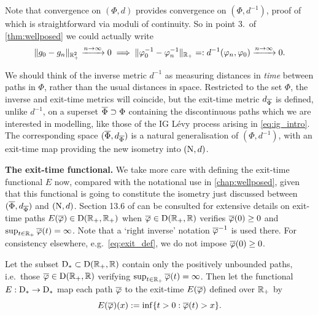Note that convergence on $(\Phi,d)$ provides convergence on $(\Phi,d^{-1})$, proof of which is straightforward via moduli of continuity. So in point 3.~of \autoref{thm:wellposed} we could actually write
\begin{equation}\label{eq:inverse_cont}
    \Vert g_0-g_n\Vert_{\mathbb{R}_+^2}\xrightarrow{n\to\infty}0 \implies \Vert \varphi_0^{-1}-\varphi_n^{-1}\Vert_{\mathbb{R}_+}=:d^{-1}(\varphi_n,\varphi_0)\xrightarrow{n\to\infty}0.
\end{equation}

We should think of the inverse metric $d^{-1}$ as measuring distances in \emph{time} between paths in $\Phi$, rather than the usual distances in space. Restricted to the set $\Phi$, the inverse and exit-time metrics will coincide, but the exit-time metric $d_{\overline{\Phi}}$ is defined, unlike $d^{-1}$, on a superset $\overline{\Phi}\supset\Phi$ containing the discontinuous paths which we are interested in modelling, like those of the IG L\'evy process arising in \autoref{eq:ig_intro}. The corresponding space $(\overline{\Phi},d_{\overline{\Phi}})$ is a natural generalisation of $(\Phi,d^{-1})$, with an exit-time map providing the new isometry into $(\mathrm{N},d)$.

\vspace{3mm}\textbf{The exit-time functional.} We take more care with defining the exit-time functional $E$ now, compared with the notational use in \autoref{chap:wellposed}, given that this functional is going to constitute the isometry just discussed between $(\overline{\Phi},d_{\overline{\Phi}})$ and $(\mathrm{N},d)$. Section 13.6 of \cite{whitt_2002} can be consulted for extensive details on exit-time paths $E(\overline{\varphi})\in\mathrm{D}(\mathbb{R}_+,\mathbb{R}_+)$ when $\overline{\varphi}\in\mathrm{D}(\mathbb{R}_+,\mathbb{R})$ verifies $\overline{\varphi}(0)\ge0$ and $\sup_{t\in\mathbb{R}_+}\overline{\varphi}(t)=\infty$. Note that a `right inverse' notation $\overline{\varphi}^{-1}$ is used there. For consistency elsewhere, e.g.~\autoref{eq:exit_def}, we do not impose $\overline{\varphi}(0)\ge0$.

\begin{definition}\label{def:exit_functional}
    Let the subset $\mathrm{D}_*\subset \mathrm{D}(\mathbb{R}_+,\mathbb{R})$ contain only the positively unbounded paths, i.e.~those $\overline{\varphi}\in\mathrm{D}(\mathbb{R}_+,\mathbb{R})$ verifying $\sup_{t\in\mathbb{R}_+}\overline{\varphi}(t)=\infty$. Then let the functional $E:\mathrm{D}_*\to\mathrm{D}_*$ map each path $\overline{\varphi}$ to the exit-time $E(\overline{\varphi})$ defined over $\mathbb{R}_+$ by
    \begin{equation}\label{eq:sep_cases}
        E(\overline{\varphi})(x) := \inf\{t>0 : \overline{\varphi}(t)>x\}.
    \end{equation}
\end{definition}


